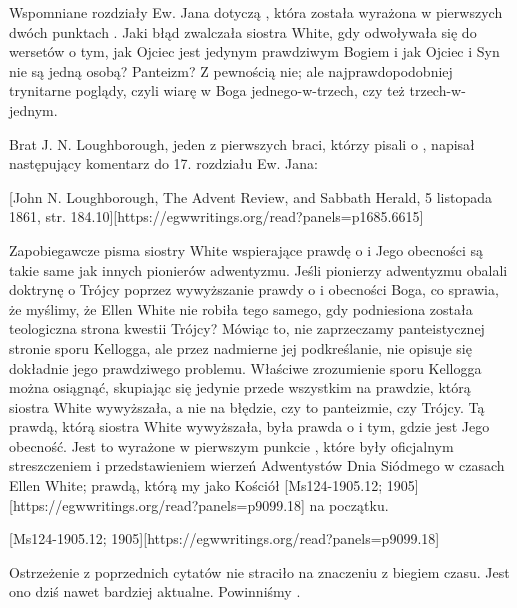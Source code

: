 Wspomniane rozdziały Ew. Jana dotyczą , która została wyrażona w pierwszych dwóch punktach . Jaki błąd zwalczała siostra White, gdy odwoływała się do wersetów o tym, jak Ojciec jest jedynym prawdziwym Bogiem i jak Ojciec i Syn nie są jedną osobą? Panteizm? Z pewnością nie; ale najprawdopodobniej trynitarne poglądy, czyli wiarę w Boga jednego-w-trzech, czy też trzech-w-jednym.

Brat J. N. Loughborough, jeden z pierwszych braci, którzy pisali o , napisał następujący komentarz do 17. rozdziału Ew. Jana:

[John N. Loughborough, The Advent Review, and Sabbath Herald, 5 listopada 1861, str. 184.10][https://egwwritings.org/read?panels=p1685.6615]

Zapobiegawcze pisma siostry White wspierające prawdę o  i Jego obecności są takie same jak innych pionierów adwentyzmu. Jeśli pionierzy adwentyzmu obalali doktrynę o Trójcy poprzez wywyższanie prawdy o  i obecności Boga, co sprawia, że myślimy, że Ellen White nie robiła tego samego, gdy podniesiona została teologiczna strona kwestii Trójcy? Mówiąc to, nie zaprzeczamy panteistycznej stronie sporu Kellogga, ale przez nadmierne jej podkreślanie, nie opisuje się dokładnie jego prawdziwego problemu. Właściwe zrozumienie sporu Kellogga można osiągnąć, skupiając się jedynie przede wszystkim na prawdzie, którą siostra White wywyższała, a nie na błędzie, czy to panteizmie, czy Trójcy. Tą prawdą, którą siostra White wywyższała, była prawda o  i tym, gdzie jest Jego obecność. Jest to wyrażone w pierwszym punkcie , które były oficjalnym streszczeniem i przedstawieniem wierzeń Adwentystów Dnia Siódmego w czasach Ellen White; prawdą, którą my jako Kościół [Ms124-1905.12; 1905][https://egwwritings.org/read?panels=p9099.18] na początku.

[Ms124-1905.12; 1905][https://egwwritings.org/read?panels=p9099.18]

Ostrzeżenie z poprzednich cytatów nie straciło na znaczeniu z biegiem czasu. Jest ono dziś nawet bardziej aktualne. Powinniśmy .


